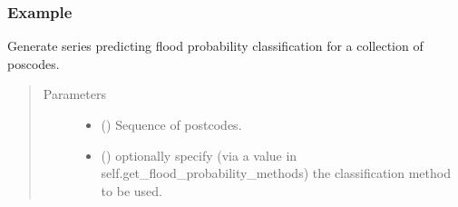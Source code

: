 \documentclass[letterpaper,10pt,english]{sphinxmanual}
\begin{document}
\begin{fulllineitems}
\begin{fulllineitems}
\subsubsection*{Example}

\begin{sphinxVerbatim}[commandchars=\\\{\}]
\PYG{p}{[} \PYG{p}{]}
\end{sphinxVerbatim}

\begin{sphinxVerbatim}[commandchars=\\\{\}]
\PYG{p}{[}\PYG{p}{]}
\end{sphinxVerbatim}

\end{fulllineitems}


\begin{fulllineitems}
\label{\detokenize{index:flood_tool.Tool.get_flood_class}}
\sphinxAtStartPar
Generate series predicting flood probability classification
for a collection of poscodes.
\begin{quote}\begin{description}
\item[{Parameters}] \leavevmode\begin{itemize}
\item {} 
\sphinxAtStartPar
{} () \textendash{} Sequence of postcodes.

\item {} 
\sphinxAtStartPar
{} (\sphinxstyleliteralemphasis{\sphinxupquote{ (}}\sphinxstyleliteralemphasis{\sphinxupquote{)}}) \textendash{} optionally specify (via a value in
self.get\_flood\_probability\_methods) the classification
method to be used.


\end{itemize}
\end{description}
\end{quote}
\end{fulllineitems}
\end{fulllineitems}
\end{document}
